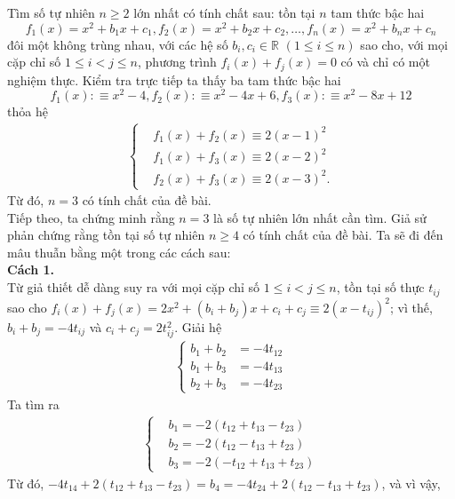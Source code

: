 \begin{bt}%
	Tìm số tự nhiên $n \geq 2$ lớn nhất có tính chất sau: tồn tại $n$ tam thức bậc hai 
	$$f_{1}(x)=x^{2}+b_{1}x+c_{1}, f_{2}(x)=x^{2}+b_{2}x+c_{2},\ldots, f_{n}(x)=x^{2}+b_{n}x+c_{n}$$ đôi một không trùng nhau, với các hệ số $b_{i}, c_{i} \in \mathbb{R}$ $(1\leq i\leq n)$ sao cho, với mọi cặp chỉ số $1 \leq i < j\leq n$, phương trình $f_{i}(x)+f_{j}(x)=0$ có và chỉ có một nghiệm thực.
	\loigiai
	{
	Kiểm tra trực tiếp ta thấy ba tam thức bậc hai 
	$$f_{1}(x):\equiv x^{2}-4, f_{2}(x):\equiv x^{2}-4x+6,  f_{3}(x):\equiv x^{2}-8x+12$$
	thỏa hệ
	\begin{align*}
	\left\{\begin{aligned}
	&f_{1}(x)+	f_{2}(x) \equiv 2(x-1)^{2} \\
	&f_{1}(x)+	f_{3}(x) \equiv 2(x-2)^{2} \\
	&f_{2}(x)+	f_{3}(x) \equiv 2(x-3)^{2}.
	\end{aligned}\right.
	\end{align*}
	Từ đó, $n=3$ có tính chất của đề bài.\\
	Tiếp theo, ta chứng minh rằng $n=3$ là số tự nhiên lớn nhất cần tìm. Giả sử phản chứng rằng tồn tại số tự nhiên $n\geq 4$ có tính chất của đề bài. Ta sẽ đi đến mâu thuẫn bằng một trong các cách sau: \\
	\textbf{Cách 1.}\\
	Từ giả thiết dễ dàng suy ra với mọi cặp chỉ số $1\leq i < j \leq n$, tồn tại số thực $t_{ij}$ sao cho $f_{i}(x)+f_{j}(x)=2x^{2}+\left(b_{i}+b_{j}\right)x+c_i+c_j \equiv 2(x-t_{ij})^{2}$; vì thế, $b_i+b_j=-4t_{ij}$ và $c_i+c_j=2t_{ij}^{2}$. Giải hệ
	\begin{align*}
	\left\{\begin{aligned}
	b_{1}+	b_{2} &= -4t_{12} \\
	b_{1}+	b_{3} &= -4t_{13} \\
	b_{2}+	b_{3} &= -4t_{23}
	\end{aligned}\right.
	\end{align*}
	Ta tìm ra
	\begin{align*}
	\left\{\begin{aligned}
	& b_{1} = -2(t_{12}+t_{13}-t_{23}) \\
	& b_{2} = -2(t_{12}-t_{13}+t_{23})\\
	& b_{3} = -2(-t_{12}+t_{13}+t_{23})
	\end{aligned}\right.
	\end{align*}
	Từ đó, $-4t_{14}+2(t_{12}+t_{13}-t_{23})=b_{4}=-4t_{24}+2(t_{12}-t_{13}+t_{23})$, và vì vậy, \begin {align} 

\end{align}}
\end{bt}
